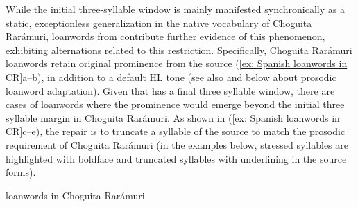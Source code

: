 While the initial three-syllable window is mainly manifested synchronically as a static, exceptionless generalization in the native vocabulary of Choguita Rarámuri, loanwords from  contribute further evidence of this phenomenon, exhibiting alternations related to this restriction. Specifically, Choguita Rarámuri loanwords retain original prominence from the  source (\ref{ex: Spanish loanwords in CR}a--b), in addition to a default HL tone (see also \citealt{caballero2013procesos} and  below about prosodic loanword adaptation). Given that  has a final three syllable window, there are cases of loanwords where the prominence would emerge beyond the initial three syllable margin in Choguita Rarámuri. As shown in (\ref{ex: Spanish loanwords in CR}c--e), the repair is to truncate a syllable of the  source to match the prosodic requirement of Choguita Rarámuri (in the examples below, stressed syllables are highlighted with boldface and truncated syllables with underlining in the  source forms).

\ea\label{ex: Spanish loanwords in CR}
{ loanwords in Choguita Rarámuri}

    \z
\z


